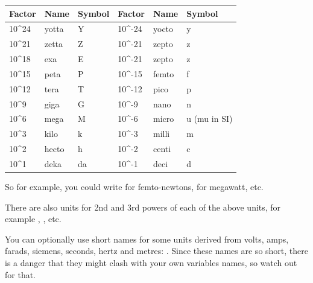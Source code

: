 \documentclass[letterpaper,10pt,english]{manual}
\begin{document}
\begin{tabulary}{\textwidth}{|L|L|L|L|L|L|}
\hline
\textbf{
Factor
} & \textbf{
Name
} & \textbf{
Symbol
} & \textbf{
Factor
} & \textbf{
Name
} & \textbf{
Symbol
}\\
\hline

10\textasciicircum{}24
 & 
yotta
 & 
Y
 & 
10\textasciicircum{}-24
 & 
yocto
 & 
y
\\

10\textasciicircum{}21
 & 
zetta
 & 
Z
 & 
10\textasciicircum{}-21
 & 
zepto
 & 
z
\\

10\textasciicircum{}18
 & 
exa
 & 
E
 & 
10\textasciicircum{}-21
 & 
zepto
 & 
z
\\

10\textasciicircum{}15
 & 
peta
 & 
P
 & 
10\textasciicircum{}-15
 & 
femto
 & 
f
\\

10\textasciicircum{}12
 & 
tera
 & 
T
 & 
10\textasciicircum{}-12
 & 
pico
 & 
p
\\

10\textasciicircum{}9
 & 
giga
 & 
G
 & 
10\textasciicircum{}-9
 & 
nano
 & 
n
\\

10\textasciicircum{}6
 & 
mega
 & 
M
 & 
10\textasciicircum{}-6
 & 
micro
 & 
u (mu in SI)
\\

10\textasciicircum{}3
 & 
kilo
 & 
k
 & 
10\textasciicircum{}-3
 & 
milli
 & 
m
\\

10\textasciicircum{}2
 & 
hecto
 & 
h
 & 
10\textasciicircum{}-2
 & 
centi
 & 
c
\\

10\textasciicircum{}1
 & 
deka
 & 
da
 & 
10\textasciicircum{}-1
 & 
deci
 & 
d
\\
\hline
\end{tabulary}


So for example, you could write  for femto-newtons,  for megawatt, etc.

There are also units for 2nd and 3rd powers of each of the above units, for example
, , etc.

You can optionally use short names for some units derived from volts, amps,
farads, siemens, seconds, hertz and metres:
.
Since these names are so short, there is a danger that they might clash with your
own variables names, so watch out for that.
\end{document}
